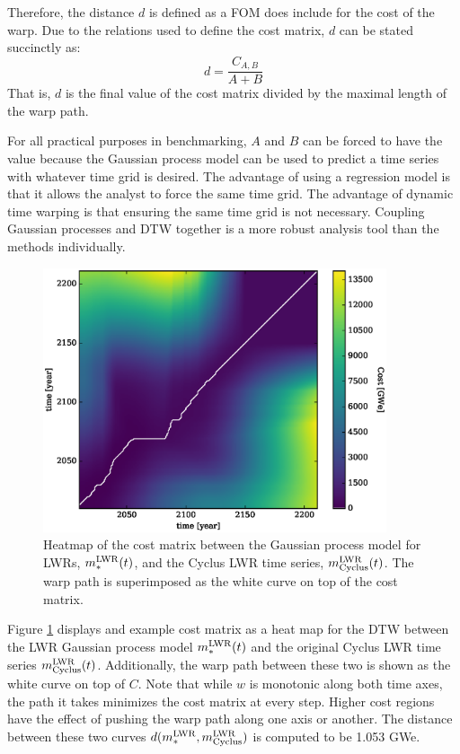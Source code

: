 Therefore, the distance $d$ is defined as a FOM does include for the cost of the
warp.  Due to the relations used to define the cost matrix, $d$ can be stated
succinctly as:
\begin{equation}
\label{d-calc}
d = \frac{C_{A,B}}{A + B}
\end{equation}
That is, $d$ is the final value of the cost matrix divided by the maximal length 
of the warp path.

For all practical purposes in benchmarking, $A$ and $B$ can be forced to have the 
value because the Gaussian process model can be used to predict a time series 
with whatever time grid is desired.  The advantage of using a regression model 
is that it allows the analyst to force the same time grid.  The advantage of 
dynamic time warping is that ensuring the same time grid is not necessary.
Coupling Gaussian processes and DTW together is a more robust analysis tool 
than the methods individually.

\begin{figure}[htb]
\centering
\includegraphics[width=0.9\textwidth]{cost-lwr-model-to-lwr-cyclus.eps}
\caption{Heatmap of the cost matrix between the Gaussian process model 
for LWRs, $m_*^{\mathrm{LWR}}(t)$, and the Cyclus LWR time series, $m_{\mathrm{Cyclus}}^{\mathrm{LWR}}(t)$.
The warp path is superimposed as the white curve on top of the cost matrix.}
\label{cost-lwr-model-to-lwr-cyclus}
\end{figure}

Figure \ref{cost-lwr-model-to-lwr-cyclus} displays and example cost matrix 
as a heat map for the DTW between the LWR Gaussian process model 
$m_*^{\mathrm{LWR}}(t)$ and the original Cyclus LWR time series $m_{\mathrm{Cyclus}}^{\mathrm{LWR}}(t)$.
Additionally, the warp path between these two is shown as the white curve
on top of $C$. Note that while $w$ is monotonic along both time axes, the
path it takes minimizes the cost matrix at every step. Higher cost regions
have the effect of pushing the warp path along one axis or another. The 
distance between these two curves $d(m_*^{\mathrm{LWR}}, m_{\mathrm{Cyclus}}^{\mathrm{LWR}})$ is computed 
to be 1.053 GWe.

